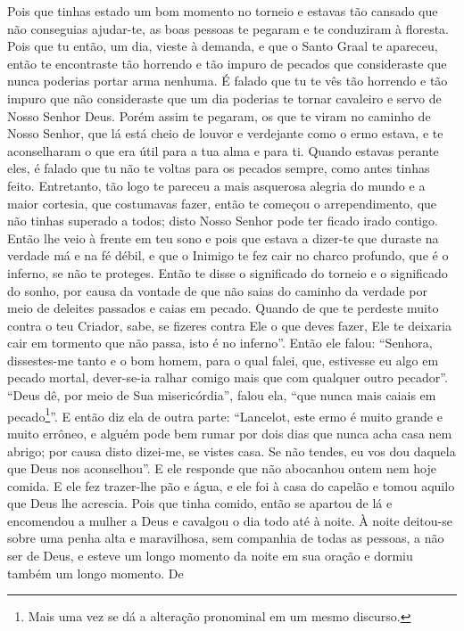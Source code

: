 Pois que tinhas estado um bom momento no torneio e estavas tão cansado que não
conseguias ajudar-te, as boas pessoas te pegaram e te conduziram à floresta.
Pois que tu então, um dia, vieste à demanda, e que o Santo Graal te apareceu,
então te encontraste tão horrendo e tão impuro de pecados que consideraste que
nunca poderias portar arma nenhuma. É falado que tu te vês tão horrendo e tão
impuro que não consideraste que um dia poderias te tornar cavaleiro e servo de
Nosso Senhor Deus. Porém assim te pegaram, os que te viram no caminho de Nosso
Senhor, que lá está cheio de louvor e verdejante como o ermo estava, e te
aconselharam o que era útil para a tua alma e para ti. Quando estavas perante
eles, é falado que tu não te voltas para os pecados sempre, como antes tinhas
feito. Entretanto, tão logo te pareceu a mais asquerosa alegria do mundo e a
maior cortesia, que costumavas fazer, então te começou o arrependimento, que
não tinhas superado a todos; disto Nosso Senhor pode ter ficado irado contigo.
Então lhe veio à frente em teu sono e pois que estava a dizer-te que duraste na
verdade má e na fé débil, e que o Inimigo te fez cair no charco profundo, que é
o inferno, se não te proteges. Então te disse o significado do torneio e o
significado do sonho, por causa da vontade de que não saias do caminho da
verdade por meio de deleites passados e caias em pecado. Quando de que te
perdeste muito contra o teu Criador, sabe, se fizeres contra Ele o que deves
fazer, Ele te deixaria cair em tormento que não passa, isto é no inferno”. 
Então ele falou: “Senhora, dissestes-me tanto e o bom homem, para o
qual falei, que, estivesse eu algo em pecado mortal, dever-se-ia ralhar comigo
mais que com qualquer outro pecador”. “Deus dê, por meio de Sua misericórdia”,
falou ela, “que nunca mais caiais em pecado\footnote{ Mais uma vez se dá a
alteração pronominal em um mesmo discurso.}”. E então diz ela
de outra parte: “Lancelot, este ermo é muito grande e muito errôneo, e alguém
pode bem rumar por dois dias que nunca acha casa nem abrigo; por causa disto
dizei-me, se vistes casa. Se não tendes, eu vos dou daquela que Deus nos
aconselhou”. E ele responde que não abocanhou ontem nem hoje comida. E ele fez
trazer-lhe pão e água, e ele foi à casa do capelão e tomou aquilo que Deus lhe
acrescia. Pois que tinha comido, então se apartou de lá e encomendou a mulher a
Deus e cavalgou o dia todo até à noite. À noite deitou-se sobre uma penha alta
e maravilhosa, sem companhia de todas as pessoas, a não ser de Deus, e esteve
um longo momento da noite em sua oração e dormiu também um longo momento. De
